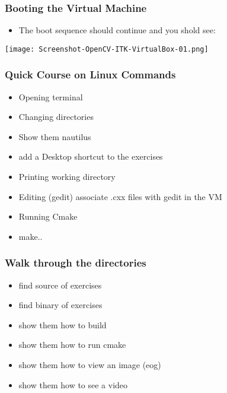 \begin{frame}
\frametitle{Booting the Virtual Machine}
\begin{itemize}
\item The boot sequence should continue and you shold see:
\end{itemize}
\begin{center}
  \texttt{[image: Screenshot-OpenCV-ITK-VirtualBox-01.png]}
\end{center}
\end{frame}

\begin{frame}
\frametitle{Quick Course on Linux Commands}
\begin{itemize}
\item Opening terminal
\item Changing directories
\item Show them nautilus 
\item add a Desktop shortcut to the exercises
\item Printing working directory
\item Editing (gedit) associate .cxx files with gedit in the VM
\item Running Cmake
\item make..
\end{itemize}
\end{frame}


\begin{frame}
\frametitle{Walk through the directories}
\begin{itemize}
\item find source of exercises
\item find binary of exercises
\item show them how to build
\item show them how to run cmake
\item show them how to view an image (eog)
\item show them how to see a video
\end{itemize}
\end{frame}



